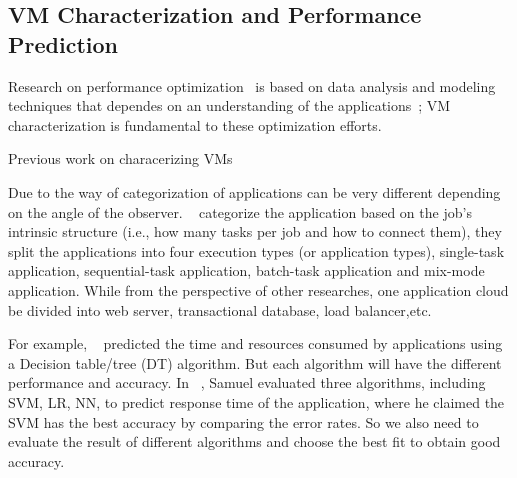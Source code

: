 \subsection{VM Characterization and Performance Prediction}


Research on performance optimization~\cite{Yang2005,Matsunaga2010,OguraM10}
is based on data analysis and modeling techniques that dependes on an understanding of the applications~\cite{Shan2008}; VM characterization is fundamental to these optimization efforts. 

Previous work on characerizing VMs 

Due to the way of categorization of applications can be very different depending on the angle of the observer. ~\cite{Derrick2014} categorize the application based on the job’s intrinsic structure (i.e., how many tasks per job and how to connect them), they split the applications into four execution types (or application types), single-task application, sequential-task application, batch-task application and mix-mode application. While from the perspective of other researches, one application cloud be divided into web server, transactional database, load balancer,etc.

For example, ~\cite{Matsunaga2010} predicted the time and resources consumed by applications using a Decision table/tree (DT) algorithm. But each algorithm will have the different performance and accuracy. In ~\cite{Samuel2013}, Samuel evaluated three algorithms, including SVM, LR, NN, to predict response time of the application, where he claimed the SVM has the best accuracy by comparing the error rates. So we also need to evaluate the result of different algorithms and choose the best fit to obtain good accuracy.

